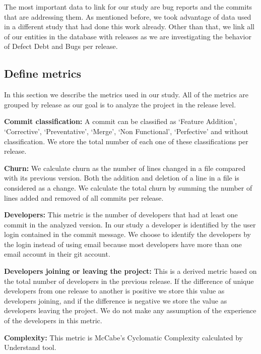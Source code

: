 The most important data to link for our study are bug reports and the commits that are addressing them. As mentioned before, we took advantage of data used in a different study that had done this work already. Other than that, we link all of our entities in the database with releases as we are investigating the behavior of Defect Debt and Bugs per release. 

\subsection{Define metrics}

In this section we describe the metrics used in our study. All of the metrics are grouped by release as our goal is to analyze the project in the release level. 

\textbf{Commit classification:} A commit can be classified as `Feature Addition', `Corrective', `Preventative', `Merge', `Non Functional', `Perfective' and without classification. We store the total number of each one of these classifications per release. 

\textbf{Churn:} We calculate churn as the number of lines changed in a file compared with its previous version. Both the addition and deletion of a line in a file is considered as a change. We calculate the total churn by summing the number of lines added and removed of all commits per release. 

\textbf{Developers:} This metric is the number of developers that had at least one commit in the analyzed version. In our study a developer is identified by the user login contained in the commit message. We choose to identify the developers by the login instead of using email because most developers have more than one email account in their git account. 

\textbf{Developers joining or leaving the project:} This is a derived metric based on the total number of developers in the previous release. If the difference of unique developers from one release to another is positive we store this value as developers joining, and if the difference is negative we store the value as developers leaving the project. We do not make any assumption of the experience of the developers in this metric.

\textbf{Complexity:} This metric is McCabe's Cyclomatic Complexity \cite{mccabeTSE1976} calculated by Understand tool.

